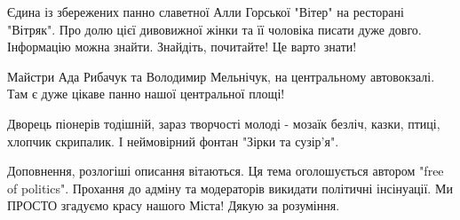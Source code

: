 Єдина із збережених панно славетної Алли Горської "Вітер" на ресторані
"Вітряк". Про долю цієї дивовижної жінки та її чоловіка писати дуже довго.
Інформацію можна знайти. Знайдіть, почитайте! Це варто знати!

Майстри Ада Рибачук та Володимир Мельнічук, на центральному автовокзалі. Там є
дуже цікаве панно нашої центральної площі!

Дворець піонерів тодішній, зараз творчості молоді - мозаїк безліч, казки,
птиці, хлопчик скрипалик. І неймовірний фонтан "Зірки та сузір'я".

Доповнення, розлогіші описання вітаються. Ця тема оголошується автором "free of
politics". Прохання до адміну та модераторів викидати політичні інсінуації. Ми
ПРОСТО згадуємо красу нашого Міста! Дякую за розуміння.
